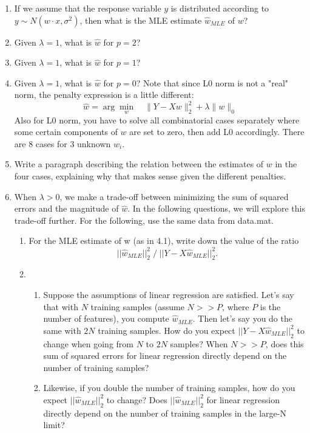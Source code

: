 \begin{enumerate}
\item If we assume that the response variable $y$ is distributed according to $y \sim N( w \cdot x, \sigma^2)$, then what is the MLE estimate $\hat{w}_{MLE}$ of $w$?
\item Given $\lambda = 1$, what is $\hat{w}$ for $p=2$? 
\item Given $\lambda = 1$, what is $\hat{w}$ for $p=1$? 
\item Given $\lambda = 1$, what is $\hat{w}$ for $p=0$? Note that since L0 norm is not a "real" norm, the penalty expression is a little different:\\
$$\hat{w} = \arg \min_w  \quad \|Y - Xw\|_2^2 + \lambda \|w\|_0$$
Also for L0 norm, you have to solve all combinatorial cases separately where some certain components of $w$ are set to zero, then add L0 accordingly. There are 8 cases for $3$ unknown $w_i$.

\item Write a paragraph describing the relation between the estimates of
$w$ in the four cases, explaining why that makes sense given the
different penalties.

\item When $\lambda > 0$, we make a trade-off between minimizing the sum of squared errors and the magnitude of $\hat{w}$. In the following questions, we will explore this trade-off further. For the following, use the same data from data.mat.
\begin{enumerate}
\item For the MLE estimate of w (as in 4.1), write down the value of the ratio $$||\hat{w}_{MLE}||_2^2  \; / \; ||Y-X\hat{w}_{MLE}||_2^2.$$

\item
\begin{enumerate}
	\item Suppose the assumptions of linear regression are satisfied. Let's say that with $N$ training samples (assume $N >> P$, where $P$ is the number of features), you compute $\hat{w}_{MLE}$. Then let's say you do the same with $2N$ training samples. How do you expect $||Y-X\hat{w}_{MLE}||_2^2$ to change when going from $N$ to $2N$ samples? When $N>>P$, does this sum of squared errors for linear regression directly depend on the number of training samples?

	\item Likewise, if you double the number of training samples, how do you expect $||\hat{w}_{MLE}||_2^2$ to change? Does $||\hat{w}_{MLE}||_2^2$ for linear regression directly depend on the number of training samples in the large-N limit? 


\end{enumerate}
\end{enumerate}
\end{enumerate}
